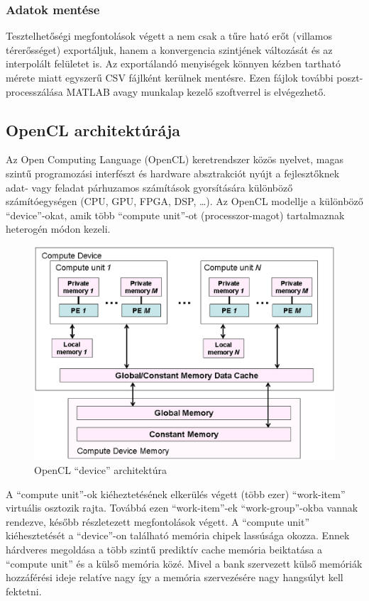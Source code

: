 		\subsubsection{Adatok mentése}
		Tesztelhetőségi megfontolások végett a nem csak a tűre ható erőt (villamos
		térerősséget) exportáljuk, hanem a konvergencia szintjének változását és az
		interpolált felületet is. Az exportálandó menyiségek könnyen kézben tartható
		mérete miatt egyszerű CSV fájlként kerülnek mentésre. Ezen fájlok további
		poszt-processzálása MATLAB avagy munkalap kezelő szoftverrel is elvégezhető.
		
	
	\subsection{OpenCL architektúrája}
		Az Open Computing Language (OpenCL) keretrendszer \cite{opencl} közös
		nyelvet, magas szintű programozási interfészt és hardware absztrakciót nyújt a fejlesztőknek
		adat- vagy feladat párhuzamos számítások gyorsítására különböző
		számítóegységen (CPU, GPU, FPGA, DSP, \ldots).
		Az OpenCL modellje a különböző ``device''-okat, amik több ``compute unit''-ot
		(processzor-magot) tartalmaznak heterogén módon kezeli. 
		
		\begin{figure}[!ht]
			\centering
			\includegraphics[width=0.95\columnwidth]{kepek/opencl_device.eps}
			\caption{OpenCL ``device'' architektúra \cite{Web:khronos}} 
			\label{fig:device} 
		\end{figure}
		
		A ``compute unit''-ok kiéheztetésének elkerülés végett (több ezer)
		``work-item'' virtuális osztozik rajta.
		Továbbá ezen ``work-item''-ek ``work-group''-okba vannak rendezve, később
		részletezett megfontolások végett.
		A ``compute unit'' kiéhesztetését a ``device''-on található memória chipek lassúsága okozza.
		Ennek hárdveres megoldása a több szintű prediktív cache memória beiktatása a
		``compute unit'' és a külső memória közé.
		Mivel a bank szervezett külső memóriák hozzáférési ideje relatíve nagy
		így a memória szervezésére nagy hangsúlyt kell fektetni.
		
